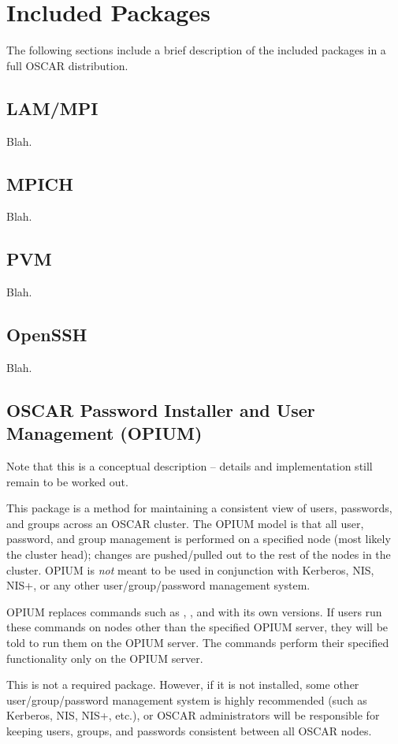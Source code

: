 %
%
%

\section{Included Packages}

The following sections include a brief description of the included
packages in a full OSCAR distribution.

\subsection{LAM/MPI}

Blah.

\subsection{MPICH}

Blah.

\subsection{PVM}

Blah.

\subsection{OpenSSH}

Blah.

\subsection{OSCAR Password Installer and User Management (OPIUM)}

\begin{discuss}
  Note that this is a conceptual description -- details and
  implementation still remain to be worked out.
\end{discuss}

This package is a method for maintaining a consistent view of users,
passwords, and groups across an OSCAR cluster.  The OPIUM model is
that all user, password, and group management is performed on a
specified node (most likely the cluster head); changes are
pushed/pulled out to the rest of the nodes in the cluster.  OPIUM is
{\em not} meant to be used in conjunction with Kerberos, NIS, NIS+, or
any other user/group/password management system.

OPIUM replaces commands such as , , and
 with its own versions.  If users run these commands on
nodes other than the specified OPIUM server, they will be told to run
them on the OPIUM server.  The commands perform their specified
functionality only on the OPIUM server.

This is not a required package.  However, if it is not installed, some
other user/group/password management system is highly recommended
(such as Kerberos, NIS, NIS+, etc.), or OSCAR administrators will be
responsible for keeping users, groups, and passwords consistent
between all OSCAR nodes.

